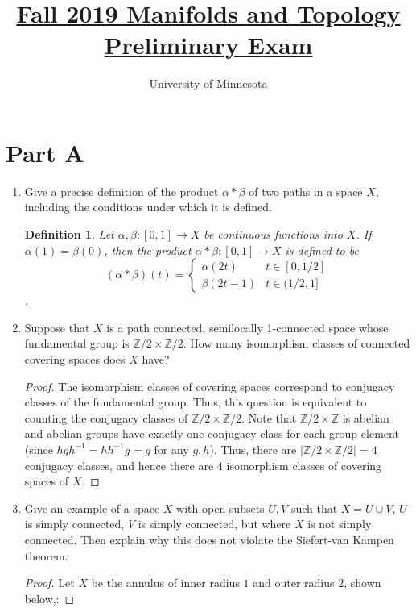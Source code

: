\documentclass{article}
\title{\href{https://math.umn.edu/sites/math.umn.edu/files/exams/mantopf19.pdf}{Fall 2019 Manifolds and Topology Preliminary Exam}}
\author{University of Minnesota}
\date{}
\newtheorem*{definition}{Definition}
\begin{document}
\maketitle

\section*{Part A}
\begin{enumerate}
	\item Give a precise definition of the product $\alpha * \beta$ of two paths in a space $X$, including the conditions under which it is defined.
	
	\begin{definition}
	Let $\alpha, \beta: [0,1] \rightarrow X$ be continuous functions into $X$. If $\alpha (1) = \beta(0)$, then the product
	$\alpha * \beta: [0,1] \rightarrow X$ is defined to be 
	\[ (\alpha * \beta ) (t) = \begin{cases} \alpha(2t) & t \in [0,1/2] \\  \beta(2t-1) & t \in (1/2,1]\end{cases}\].
	\end{definition}
	
	\item Suppose that $X$ is a path connected, semilocally 1-connected space whose fundamental group is $\mathbb{Z}/2 \times \mathbb{Z}/2$. How many isomorphism classes of connected covering spaces does $X$ have?
	
	\begin{proof}
		The isomorphism classes of covering spaces correspond to conjugacy classes of the fundamental group. 
		Thus, this question is equivalent to counting the conjugacy classes of $\mathbb{Z}/2 \times \mathbb{Z}/2$.
		Note that $\mathbb{Z}/2 \times \mathbb{Z}$ is abelian and abelian groups have exactly one conjugacy class for each group element (since $h g h^{-1} = h h^{-1} g = g$ for any $g,h$).
		Thus, there are $|\mathbb{Z}/2 \times \mathbb{Z}/2| = 4$ conjugacy classes, and hence there are $4$ isomorphism classes of covering spaces of $X$.
	\end{proof}
	
	\item Give an example of a space $X$ with open subsets $U,V$ such that $X = U\cup V$, $U$ is simply connected, $V$ is simply connected, but where $X$ is not simply connected. 
	Then explain why this does not violate the Siefert-van Kampen theorem. 
	
	\begin{proof}
		Let $X$ be the annulus of inner radius $1$ and outer radius $2$, shown below,:
		

\end{proof}
\end{enumerate}
\end{document}
